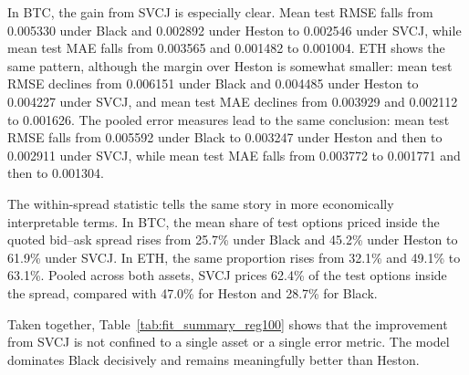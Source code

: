 \documentclass[a4paper,titlepage,12pt]{report}
\theoremstyle{plain}
\begin{document}
\begin{table}[H]
\centering
\caption{Average out-of-sample pricing diagnostics at $\lambda_{TS}=100$, by asset and model.}
\label{tab:fit_summary_reg100}
\end{table}

In BTC, the gain from SVCJ is especially clear. Mean test RMSE falls from 0.005330 under Black and 0.002892 under Heston to 0.002546 under SVCJ, while mean test MAE falls from 0.003565 and 0.001482 to 0.001004. ETH shows the same pattern, although the margin over Heston is somewhat smaller: mean test RMSE declines from 0.006151 under Black and 0.004485 under Heston to 0.004227 under SVCJ, and mean test MAE declines from 0.003929 and 0.002112 to 0.001626. The pooled error measures lead to the same conclusion: mean test RMSE falls from 0.005592 under Black to 0.003247 under Heston and then to 0.002911 under SVCJ, while mean test MAE falls from 0.003772 to 0.001771 and then to 0.001304.

The within-spread statistic tells the same story in more economically interpretable terms. In BTC, the mean share of test options priced inside the quoted bid--ask spread rises from 25.7\% under Black and 45.2\% under Heston to 61.9\% under SVCJ. In ETH, the same proportion rises from 32.1\% and 49.1\% to 63.1\%. Pooled across both assets, SVCJ prices 62.4\% of the test options inside the spread, compared with 47.0\% for Heston and 28.7\% for Black. 

Taken together, Table~\ref{tab:fit_summary_reg100} shows that the improvement from SVCJ is not confined to a single asset or a single error metric. The model dominates Black decisively and remains meaningfully better than Heston.
\end{document}
